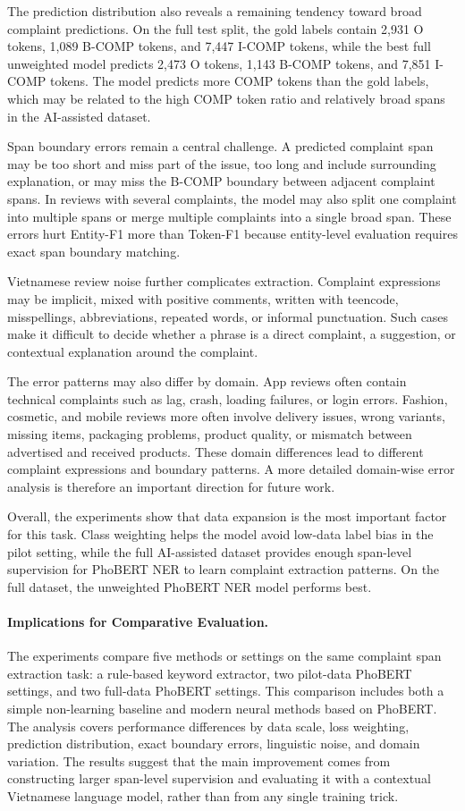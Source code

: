 \documentclass[11pt]{article}
\begin{document}
The prediction distribution also reveals a remaining tendency toward broad complaint predictions. On the full test split, the gold labels contain 2,931 O tokens, 1,089 B-COMP tokens, and 7,447 I-COMP tokens, while the best full unweighted model predicts 2,473 O tokens, 1,143 B-COMP tokens, and 7,851 I-COMP tokens. The model predicts more COMP tokens than the gold labels, which may be related to the high COMP token ratio and relatively broad spans in the AI-assisted dataset.

Span boundary errors remain a central challenge. A predicted complaint span may be too short and miss part of the issue, too long and include surrounding explanation, or may miss the B-COMP boundary between adjacent complaint spans. In reviews with several complaints, the model may also split one complaint into multiple spans or merge multiple complaints into a single broad span. These errors hurt Entity-F1 more than Token-F1 because entity-level evaluation requires exact span boundary matching.

Vietnamese review noise further complicates extraction. Complaint expressions may be implicit, mixed with positive comments, written with teencode, misspellings, abbreviations, repeated words, or informal punctuation. Such cases make it difficult to decide whether a phrase is a direct complaint, a suggestion, or contextual explanation around the complaint.

The error patterns may also differ by domain. App reviews often contain technical complaints such as lag, crash, loading failures, or login errors. Fashion, cosmetic, and mobile reviews more often involve delivery issues, wrong variants, missing items, packaging problems, product quality, or mismatch between advertised and received products. These domain differences lead to different complaint expressions and boundary patterns. A more detailed domain-wise error analysis is therefore an important direction for future work.

Overall, the experiments show that data expansion is the most important factor for this task. Class weighting helps the model avoid low-data label bias in the pilot setting, while the full AI-assisted dataset provides enough span-level supervision for PhoBERT NER to learn complaint extraction patterns. On the full dataset, the unweighted PhoBERT NER model performs best.

\paragraph{Implications for Comparative Evaluation.}
The experiments compare five methods or settings on the same complaint span extraction task: a rule-based keyword extractor, two pilot-data PhoBERT settings, and two full-data PhoBERT settings. This comparison includes both a simple non-learning baseline and modern neural methods based on PhoBERT. The analysis covers performance differences by data scale, loss weighting, prediction distribution, exact boundary errors, linguistic noise, and domain variation. The results suggest that the main improvement comes from constructing larger span-level supervision and evaluating it with a contextual Vietnamese language model, rather than from any single training trick.
\end{document}
